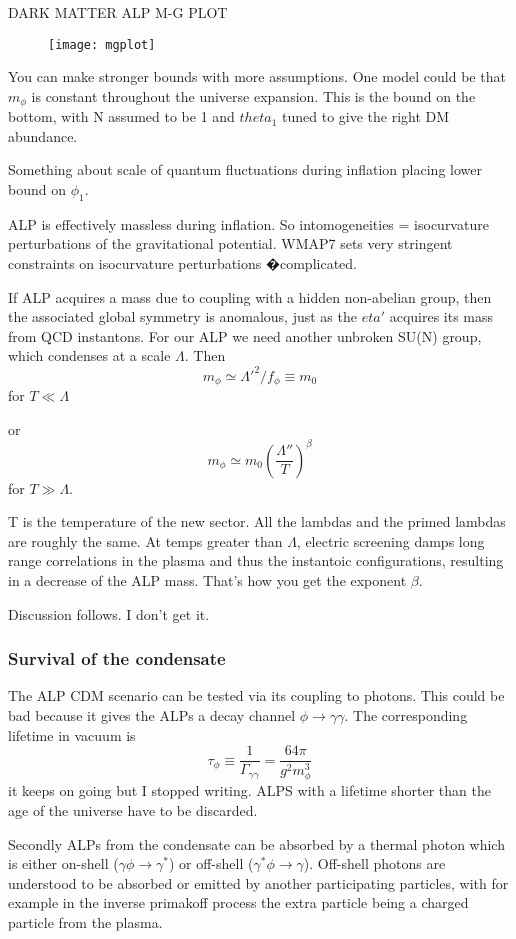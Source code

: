 \documentclass[11pt]{book}
\begin{document}
DARK MATTER ALP M-G PLOT
\begin{figure}
\texttt{[image: mgplot]}
\end{figure}

You can make stronger bounds with more assumptions. One model could be that $m_\phi$ is constant throughout the universe expansion. This is the bound on the bottom, with N assumed to be 1 and $theta_1$ tuned to give the right DM abundance.

Something about scale of quantum fluctuations during inflation placing lower bound on $\phi_1$.

ALP is effectively massless during inflation. So intomogeneities = isocurvature perturbations of the gravitational potential. WMAP7 sets very stringent constraints on isocurvature perturbations
�complicated.


If ALP acquires a mass due to coupling with a hidden non-abelian group, then the associated global symmetry is anomalous, just as the $eta'$ acquires its mass from QCD instantons. For our ALP we need another unbroken SU(N) group, which condenses at a scale $\Lambda$. Then
\[
m_\phi \simeq \Lambda'^2/f_\phi \equiv m_0
\]
for $T \ll \Lambda$

or 
\[ m_\phi \simeq m_0 (\frac{\Lambda''}{T})^{\beta} 
\]
for $T \gg \Lambda$.

T is the temperature of the new sector. All the lambdas and the primed lambdas are roughly the same. At temps greater than $\Lambda$, electric screening damps long range correlations in the plasma and thus the instantoic configurations, resulting in a decrease of the ALP mass. That's how you get the exponent $\beta$.

Discussion follows. I don't get it.

\subsubsection{Survival of the condensate}

The ALP CDM scenario can be tested via its coupling to photons. This could be bad because it gives the ALPs a decay channel $\phi \rightarrow \gamma\gamma$. The corresponding lifetime in vacuum is
\[
\tau_\phi \equiv \frac{1}{\Gamma_{\gamma\gamma}} = \frac{64 \pi}{g^2 m_\phi^3}
\]
it keeps on going but I stopped writing. ALPS with a lifetime shorter than the age of the universe have to be discarded.

Secondly ALPs from the condensate can be absorbed by a thermal photon which is either on-shell ($\gamma \phi \rightarrow \gamma^*$) or off-shell ($\gamma^*\phi \rightarrow \gamma$). Off-shell photons are understood to be absorbed or emitted by another participating particles, with for example in the inverse primakoff process the extra particle being a charged particle from the plasma.
\end{document}
